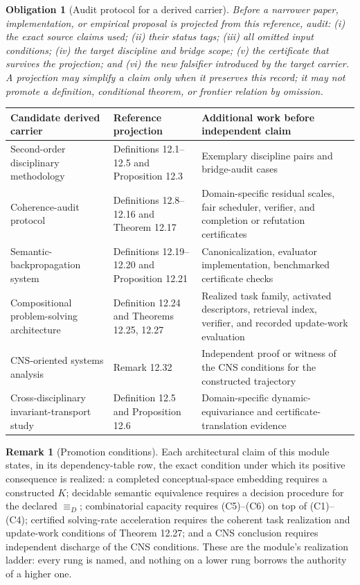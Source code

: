 \documentclass[11pt]{article}
\newtheorem{obligation}{Obligation}
\theoremstyle{definition}
\newtheorem{remark}{Remark}
\begin{document}
\begin{obligation}[Audit protocol for a derived carrier]
Before a narrower paper, implementation, or empirical proposal is projected from this reference, audit: (i) the exact source claims used; (ii) their status tags; (iii) all omitted input conditions; (iv) the target discipline and bridge scope; (v) the certificate that survives the projection; and (vi) the new falsifier introduced by the target carrier. A projection may simplify a claim only when it preserves this record; it may not promote a definition, conditional theorem, or frontier relation by omission.
\end{obligation}

\begin{center}
\small
\begin{longtable}{@{}p{}p{}p{}@{}}
\toprule
Candidate derived carrier & Reference projection & Additional work before independent claim\\
\midrule
\endhead
Second-order disciplinary methodology & Definitions 12.1--12.5 and Proposition 12.3 & Exemplary discipline pairs and bridge-audit cases\\
Coherence-audit protocol & Definitions 12.8--12.16 and Theorem 12.17 & Domain-specific residual scales, fair scheduler, verifier, and completion or refutation certificates\\
Semantic-backpropagation system & Definitions 12.19--12.20 and Proposition 12.21 & Canonicalization, evaluator implementation, benchmarked certificate checks\\
Compositional problem-solving architecture & Definition 12.24 and Theorems 12.25, 12.27 & Realized task family, activated descriptors, retrieval index, verifier, and recorded update-work evaluation\\
CNS-oriented systems analysis & Remark 12.32 & Independent proof or witness of the CNS conditions for the constructed trajectory\\
Cross-disciplinary invariant-transport study & Definition 12.5 and Proposition 12.6 & Domain-specific dynamic-equivariance and certificate-translation evidence\\
\bottomrule
\end{longtable}
\end{center}

\begin{remark}[Promotion conditions]
Each architectural claim of this module states, in its dependency-table row, the exact condition under which its positive consequence is realized: a completed conceptual-space embedding requires a constructed $K$; decidable semantic equivalence requires a decision procedure for the declared $\equiv_D$; combinatorial capacity requires (C5)--(C6) on top of (C1)--(C4); certified solving-rate acceleration requires the coherent task realization and update-work conditions of Theorem 12.27; and a CNS conclusion requires independent discharge of the CNS conditions. These are the module's realization ladder: every rung is named, and nothing on a lower rung borrows the authority of a higher one.
\end{remark}
\end{document}
